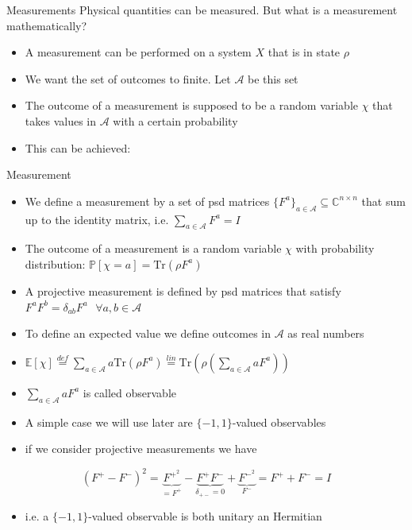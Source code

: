 \begin{frame}{Measurements}
Physical quantities can be measured. But what is a measurement mathematically? \pause
\begin{itemize}
    \item A measurement can be performed on a system $X$ that is in state $\rho$ \pause
    \item We want the set of outcomes to finite. Let $\mathcal{A}$ be this set \pause
    \item The outcome of a measurement is supposed to be a random variable $\chi$ that takes values in $\mathcal{A}$ with a certain probability \pause
    \item This can be achieved:
\end{itemize}
\begin{definition}{Measurement}
\begin{itemize}    
     \item We define a measurement by a set of psd matrices $\{ F^a \}_{a\in \mathcal{A}} \subseteq \mathbb{C}^{n \times n}$ that sum up to the identity matrix, i.e. $\sum_{a \in \mathcal{A}} F^a = I$
    \item The outcome of a measurement is a random variable $\chi$ with probability distribution: $\mathbb{P}[ \chi = a ] = \text{Tr}(\rho F^a)$
     \item A projective measurement is defined by psd matrices that satisfy $F^aF^b = \delta_{ab}F^a \text{ } \forall a,b \in \mathcal{A}$
\end{itemize}
\end{definition}
\end{frame}    
    
\begin{frame}
\begin{itemize}   
    \item To define an expected value we define outcomes in $\mathcal{A}$ as real numbers \pause
    \item $\mathbb{E} [\chi ] \overset{def}{=} \sum_{a \in \mathcal{A}} a \text{Tr} ( \rho F^a ) \overset{lin}{=}  \text{Tr} ( \rho ( \sum_{a \in \mathcal{A}} a F^a))$ \pause
    \item $\sum_{a \in \mathcal{A}} aF^a$ is called observable \pause
    \item A simple case we will use later are $\{ -1, 1 \}$-valued observables \pause
    \item if we consider projective measurements we have
\end{itemize}
    \begin{equation*}
(F^+-F^-)^2 = \underbrace{F^{+^2}}_{= F^+}- \underbrace{F^+F^-}_{\delta_{+-}=0} + \underbrace{F^{-^2}}_{F^-} = F^+ + F^- = I
\end{equation*}
\begin{itemize}
    \item i.e. a $\{ -1, 1 \}$-valued observable is both unitary an Hermitian 
\end{itemize}

\end{frame}

